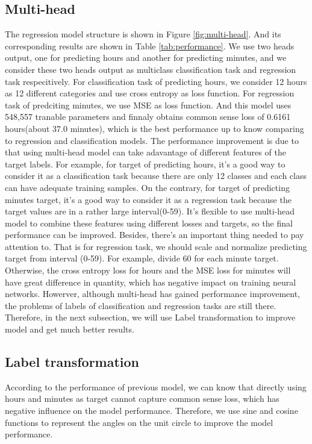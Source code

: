 \documentclass{article}
\begin{document}
\subsection{Multi-head}
The regression model structure is shown in Figure \ref{fig:multi-head}. And its corresponding results are shown in Table \ref{tab:performance}. We use two heads output, one for predicting hours and another for predicting minutes, and we consider these two heads output as multiclass classification task and regression task respecitively. For classification task of predicting hours, we consider 12 hours as 12 different categories and use cross entropy as loss function. For regression task of predciting minutes, we use MSE as loss function. And this model uses 548,557 tranable parameters and finnaly obtains common sense loss of 0.6161 hours(about 37.0 minutes), which is the best performance up to know comparing to regression and classification models. The performance improvement is due to that using multi-head model can take adavantage of different features of the target labels. For example, for target of predicting hours, it's a good way to consider it as a classification task because there are only 12 classes and each class can have adequate training samples. On the contrary, for target of predicting minutes target, it's a good way to consider it as a regression task because the target values are in a rather large interval(0-59). It's flexible to use multi-head model to combine these features using different losses and targets, so the final performance can be improved. Besides, there's an important thing needed to pay attention to. That is for regression task, we should scale and normalize predicting target from interval (0-59). For example, divide 60 for each minute target. Otherwise, the cross entropy loss for hours and the MSE loss for minutes will have great difference in quantity, which has negative impact on training neural networks. Howerver, although multi-head has gained performance improvement, the problems of labels of classification and regression tasks are still there. Therefore, in the next subsection, we will use Label transformation to improve model and get much better results.


\subsection{Label transformation}
According to the performance of previous model, we can know that directly using hours and minutes as target cannot capture common sense loss, which has negative influence on the model performance. Therefore, we use sine and cosine functions to represent the angles on the unit circle to improve the model performance.
\end{document}
